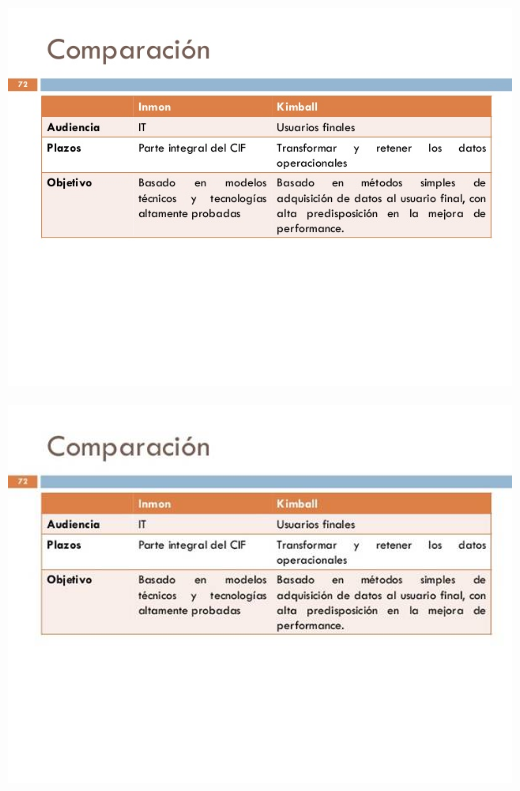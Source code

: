\begin{center}
\includegraphics[width=15cm]{./Imagenes/image017}
\end{center}
\begin{center}
\includegraphics[width=15cm]{./Imagenes/image018}
\end{center}
